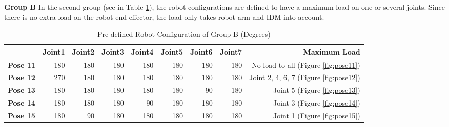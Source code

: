 \textbf{Group B}
In the second group (see in Table \ref{table-groupB}), the robot configurations are defined to have a maximum load on one or several joints. Since there is no extra load on the robot end-effector, the load only takes robot arm and IDM into account. 


\begin{table}[]
	\centering
	\caption{Pre-defined Robot Configuration of Group B (Degrees)}
	\label{table-groupB}
	\begin{tabular}{|l|r|r|r|r|r|r|r|r|}
		\hline
		\textbf{}        & \textbf{Joint1} & \textbf{Joint2} & \textbf{Joint3} & \textbf{Joint4} & \textbf{Joint5} & \textbf{Joint6} & \textbf{Joint7} & \textbf{Maximum Load}        \\ \hline
		\textbf{Pose 11} & 180              & 180              & 180              & 180              & 180              & 180              & 180              & No load to all (Figure \ref{fig:pose11})         \\ \hline
		\textbf{Pose 12} & 270              & 180              & 180              & 180              & 180              & 180              & 180              & Joint 2, 4, 6, 7 (Figure \ref{fig:pose12}) \\ \hline
		\textbf{Pose 13} & 180              & 180              & 180              & 180              & 180              & 90               & 180              & Joint 5 (Figure \ref{fig:pose13})      \\ \hline
		\textbf{Pose 14} & 180              & 180              & 180              & 90               & 180              & 180              & 180              & Joint 3 (Figure \ref{fig:pose14})      \\ \hline
		\textbf{Pose 15} & 180              & 90               & 180              & 180              & 180              & 180              & 180              & Joint 1 (Figure \ref{fig:pose15})      \\ \hline
	\end{tabular}
\end{table}


